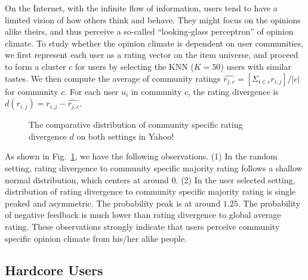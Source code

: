 \documentclass[sigconf]{acmart}
\begin{document}
On the Internet, with the infinite flow of information, users tend to have a limited vision of how others think and behave. They might focus on the opinions alike theirs, and thus perceive a so-called ``looking-glass perceptron'' of opinion climate. To study whether the opinion climate is dependent on user communities, we first represent each user as a rating vector on the item universe, and proceed to form a cluster $c$ for users by selecting the KNN ($K=50$) users with similar tastes.  We then compute the average of community ratings $\hat{r_{j,c}}=[\Sigma_{i\in c}r_{i,j}]/|c|$ for community $c$. For each user $u_i$ in community $c$, the rating divergence is   $d(r_{i,j})=r_{i,j}-\hat{r_{j,c}}$.

\begin{figure}[htbp]
\centering
\centering
{}
\caption{The comparative  distribution of community specific rating divergence $d$ on both settings in Yahoo!}\label{fig:community}
\end{figure}

As shown in Fig.~\ref{fig:community}, we have the following observations. (1) In the random setting, rating divergence to community specific majority rating follows a shallow normal distribution, which centers at around $0$.  (2) In the user selected setting, distribution of rating divergence to community specific majority rating is single peaked and asymmetric. The probability peak is at around $1.25$. The probability of negative feedback is much lower than rating divergence to global average rating. These observations strongly indicate that users perceive community specific opinion climate from his/her alike people.

\subsection{Hardcore Users}
\end{document}
